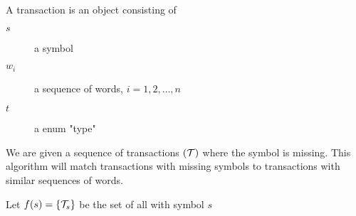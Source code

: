 A transaction \T is an object consisting of
\begin{description}
	\item[$s$] a symbol
	\item[$w_i$] a sequence of words, $i=1,2,\ldots,n$
	\item[$t$] a enum "type"
\end{description}

We are given a sequence of transactions $(\mathcal{T})$ where the symbol is missing.  This algorithm will match transactions with missing symbols to transactions with similar sequences of words.

Let $f(s)=\{\mathcal{T}_s\}$ be the set of all \T with symbol $s$